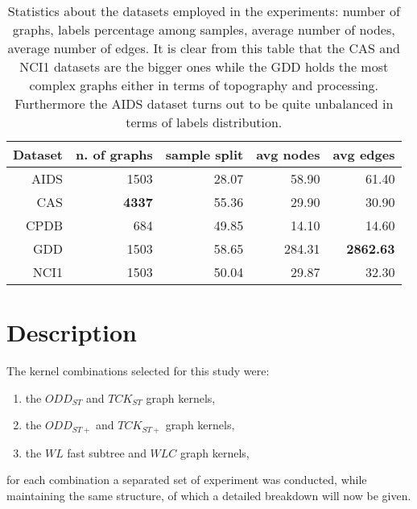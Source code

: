     \begin{table}[ht]
        \centering
        \begin{tabular}{|r|r|r|r|r|}
            \hline
            Dataset & n. of graphs & sample split & avg nodes & avg edges \\ \hline
            AIDS    & 1503         & 28.07        & 58.90     & 61.40     \\ \hline      
            CAS     & \textbf{4337} & 55.36        & 29.90     & 30.90     \\ \hline      
            CPDB    &  684         & 49.85        & 14.10     & 14.60     \\ \hline      
            GDD     & 1503         & 58.65        & 284.31    & \textbf{2862.63}   \\ \hline      
            NCI1    & 1503         & 50.04        & 29.87     & 32.30     \\ \hline      
        \end{tabular}
        \caption{Statistics about the datasets employed in the experiments: number
        of graphs, labels percentage among samples, average number of nodes, average
        number of edges. It is clear from this table that the CAS and NCI1 datasets
        are the bigger ones while the GDD holds the most complex graphs either in
        terms of topography and processing. Furthermore the AIDS dataset turns out
        to be quite unbalanced in terms of labels distribution.}
        \label{table:datasets}
    \end{table}


\section{Description}

The kernel combinations selected for this study were:
\begin{enumerate}
    \item the $ODD_{ST}$ and $TCK_{ST}$ graph kernels,
    \item the $ODD_{ST+}$ and $TCK_{ST+}$ graph kernels,
    \item the $WL$ fast subtree and $WLC$ graph kernels,
\end{enumerate}

for each combination a separated set of experiment was conducted, while maintaining
the same structure, of which a detailed breakdown will now be given.

